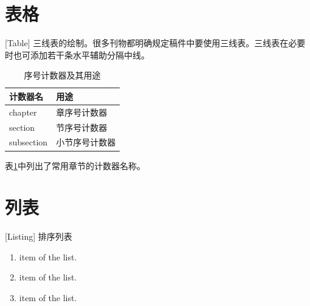 \section{表格}[Table]
三线表的绘制。很多刊物都明确规定稿件中要使用三线表。三线表在必要时也可添加若干条水平辅助分隔中线。
\begin{table}[!h]
\centering
\caption{序号计数器及其用途\label{tab:2-1}}
\begin{tabular}{@{}ll@{}}
\toprule[1pt]
计数器名   & 用途            \\ \midrule
chapter    & 章序号计数器    \\
section    & 节序号计数器    \\
subsection & 小节序号计数器  \\
\bottomrule[1pt]
\end{tabular}
\end{table}

表\ref{tab:2-1}中列出了常用章节的计数器名称。

\section{列表}[Listing]
排序列表
\begin{enumerate}
  \item item of the list.
  \item item of the list.
  \item item of the list.
\end{enumerate}


